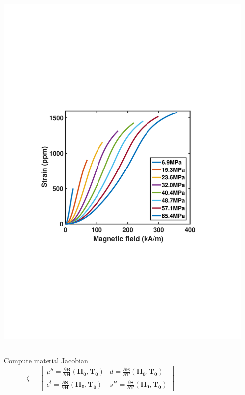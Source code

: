 \documentclass[compress]{beamer}
\begin{document}
\begin{frame}
\begin{columns}[totalwidth=\textwidth]
\begin{column}{.5\textwidth}
   \includegraphics[width=0.95\textwidth]{Graphic/02_SHterfenol.pdf}
   \end{column}
\end{columns}	
\begin{columns}[totalwidth=\textwidth] 
   \begin{column}{.6\textwidth}
   Compute material Jacobian
  \begin{equation*}
\zeta
=\begin{bmatrix}
      \mu^S = \frac{\partial \boldsymbol{B}}{\partial \boldsymbol{H}}(\boldsymbol{H_0},\boldsymbol{T_0})  & d = \frac{\partial \boldsymbol{B}}{\partial \boldsymbol{T}}(\boldsymbol{H_0},\boldsymbol{T_0})  \\[0.3em]
       d^t = \frac{\partial \boldsymbol{S}}{\partial \boldsymbol{H}}(\boldsymbol{H_0},\boldsymbol{T_0})  & s^H = \frac{\partial \boldsymbol{S}}{\partial \boldsymbol{T}}(\boldsymbol{H_0},\boldsymbol{T_0})
\end{bmatrix} 
	\end{equation*}
   \end{column}
   \begin{column}{.35\textwidth} 
   \end{column}
\end{columns}	
\end{frame}
\end{document}
